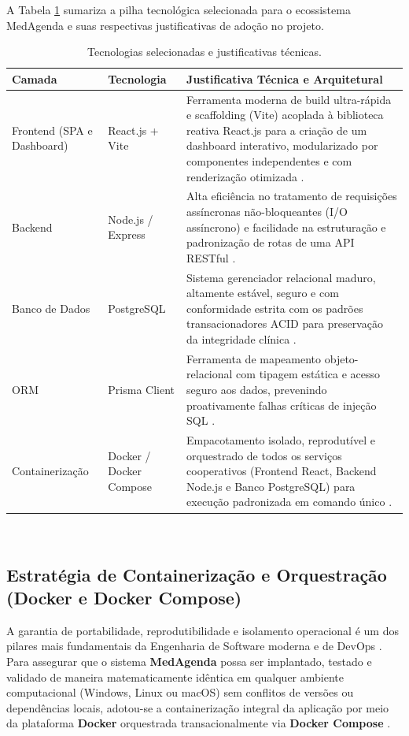 A Tabela \ref{tab:tecnologias} sumariza a pilha tecnológica selecionada para o ecossistema MedAgenda e suas respectivas justificativas de adoção no projeto.

\begin{table}[htbp]
\centering
\small
\caption{Tecnologias selecionadas e justificativas técnicas.}
\label{tab:tecnologias}
\begin{tabularx}{\textwidth}{|>{\RaggedRight\arraybackslash}p{3cm}|>{\RaggedRight\arraybackslash}p{3.2cm}|>{\RaggedRight\arraybackslash}X|}
\hline
\textbf{Camada} & \textbf{Tecnologia} & \textbf{Justificativa Técnica e Arquitetural} \\
\hline
Frontend (SPA e Dashboard) & React.js + Vite & Ferramenta moderna de build ultra-rápida e scaffolding (Vite) acoplada à biblioteca reativa React.js para a criação de um dashboard interativo, modularizado por componentes independentes e com renderização otimizada \cite{react2023}. \\
\hline
Backend & Node.js / Express & Alta eficiência no tratamento de requisições assíncronas não-bloqueantes (I/O assíncrono) e facilidade na estruturação e padronização de rotas de uma API RESTful \cite{bassi2015}. \\
\hline
Banco de Dados & PostgreSQL & Sistema gerenciador relacional maduro, altamente estável, seguro e com conformidade estrita com os padrões transacionadores ACID para preservação da integridade clínica \cite{silberschatz2020}. \\
\hline
ORM & Prisma Client & Ferramenta de mapeamento objeto-relacional com tipagem estática e acesso seguro aos dados, prevenindo proativamente falhas críticas de injeção SQL \cite{prisma2023}. \\
\hline
Containerização & Docker / Docker Compose & Empacotamento isolado, reprodutível e orquestrado de todos os serviços cooperativos (Frontend React, Backend Node.js e Banco PostgreSQL) para execução padronizada em comando único \cite{docker2023, burns2018}. \\
\hline
\end{tabularx}\\
\autoria
\end{table}

\subsection{Estratégia de Containerização e Orquestração (Docker e Docker Compose)}

A garantia de portabilidade, reprodutibilidade e isolamento operacional é um dos pilares mais fundamentais da Engenharia de Software moderna e de DevOps \cite{burns2018}. Para assegurar que o sistema \textbf{MedAgenda} possa ser implantado, testado e validado de maneira matematicamente idêntica em qualquer ambiente computacional (Windows, Linux ou macOS) sem conflitos de versões ou dependências locais, adotou-se a containerização integral da aplicação por meio da plataforma \textbf{Docker} orquestrada transacionalmente via \textbf{Docker Compose} \cite{docker2023}.

